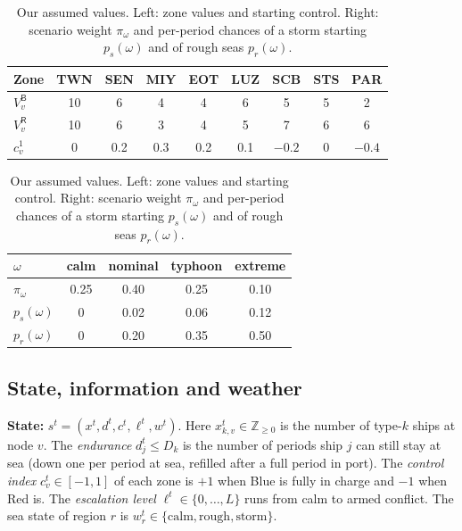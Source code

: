 \documentclass[10pt]{article}
\newcommand{\Z}{\mathbb{Z}}
\newcommand{\1}{\mathbf{1}}
\newcommand{\B}{\mathsf{B}}
\newcommand{\Rd}{\mathsf{R}}
\begin{document}
\begin{table}[H]\centering\small
\begin{minipage}[t]{0.56\textwidth}\vspace{0pt}\centering
\begin{tabular}{@{}lcccccccc@{}}
\toprule
Zone & TWN & SEN & MIY & EOT & LUZ & SCB & STS & PAR\\\midrule
$V^\B_v$ & 10 & 6 & 4 & 4 & 6 & 5 & 5 & 2\\
$V^\Rd_v$ & 10 & 6 & 3 & 4 & 5 & 7 & 6 & 6\\
$c^1_v$ & 0 & 0.2 & 0.3 & 0.2 & 0.1 & $-0.2$ & 0 & $-0.4$\\
\bottomrule
\end{tabular}
\end{minipage}\hfill
\begin{minipage}[t]{0.42\textwidth}\vspace{0pt}\centering
\begin{tabular}{@{}lcccc@{}}
\toprule
$\omega$ & calm & nominal & typhoon & extreme\\\midrule
$\pi_\omega$ & 0.25 & 0.40 & 0.25 & 0.10\\
$p_s(\omega)$ & 0 & 0.02 & 0.06 & 0.12\\
$p_r(\omega)$ & 0 & 0.20 & 0.35 & 0.50\\
\bottomrule
\end{tabular}
\end{minipage}
\caption{Our assumed values. Left: zone values and starting control. Right: scenario weight $\pi_\omega$ and per-period chances of a storm
starting $p_s(\omega)$ and of rough seas $p_r(\omega)$.}
\label{tab:zones}
\end{table}

\subsection{State, information and weather}\label{sec:state}
\textbf{State:} $s^t=(x^t,d^t,c^t,\ell^t,w^t)$. Here $x^t_{k,v}\in\Z_{\ge0}$ is the number of type-$k$ ships at node
$v$. The \emph{endurance} $d^t_j\le D_k$ is the number of periods ship $j$ can still stay at sea (down one per period
at sea, refilled after a full period in port). The \emph{control index} $c^t_v\in[-1,1]$ of each zone is $+1$ when
Blue is fully in charge and $-1$ when Red is. The \emph{escalation level} $\ell^t\in\{0,\dots,L\}$ runs from calm to
armed conflict. The sea state of region $r$ is $w^t_r\in\{\text{calm},\text{rough},\text{storm}\}$.
\end{document}

